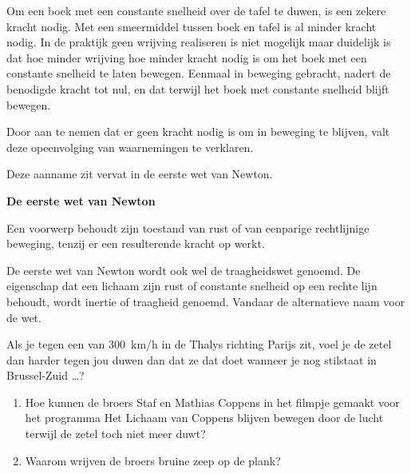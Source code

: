 \documentclass{ximera}
\begin{document}
	\author{Bart Lambregs}
    \xmsource\xmuitleg
	
Om een boek met een constante snelheid over de tafel te duwen, is een zekere kracht nodig. Met een smeermiddel tussen boek en tafel is al minder kracht nodig. In de praktijk geen wrijving realiseren is niet mogelijk maar duidelijk is dat hoe minder wrijving hoe minder kracht nodig is om het boek met een constante snelheid te laten bewegen. Eenmaal in beweging gebracht, nadert de benodigde kracht tot nul, en dat terwijl het boek met constante snelheid blijft bewegen.

Door aan te nemen dat er geen kracht nodig is om in beweging te blijven, valt deze opeenvolging van waarnemingen te verklaren.

Deze aanname zit vervat in de eerste wet van Newton.

\begin{definition}
{\textbf{De eerste wet van Newton}}\nl

Een voorwerp behoudt zijn toestand van rust of van eenparige rechtlijnige beweging, tenzij er een resulterende kracht op werkt.
\end{definition}

\begin{remark}{De eerste wet van Newton wordt ook wel de traagheidswet genoemd.}
	De eigenschap dat een lichaam zijn rust of constante snelheid op een rechte lijn behoudt, wordt inertie of traagheid genoemd. Vandaar de alternatieve naam voor de wet.
\end{remark}

\begin{denkvraag*}{}
	Als je tegen een van \SI{300}{km/h} in de Thalys richting Parijs zit, voel je de zetel dan harder tegen jou duwen dan dat ze dat doet wanneer je nog stilstaat in Brussel-Zuid \ldots?
\end{denkvraag*}

\begin{denkvraag*}{}
	\begin{enumerate}
		\item Hoe kunnen de broers Staf en Mathias Coppens in het filmpje gemaakt voor het programma Het Lichaam van Coppens blijven bewegen door de lucht terwijl de zetel toch niet meer duwt?
		\item Waarom wrijven de broers bruine zeep op de plank?
	\end{enumerate}

	\begin{center}
	\end{center}

\end{denkvraag*}
\end{document}

